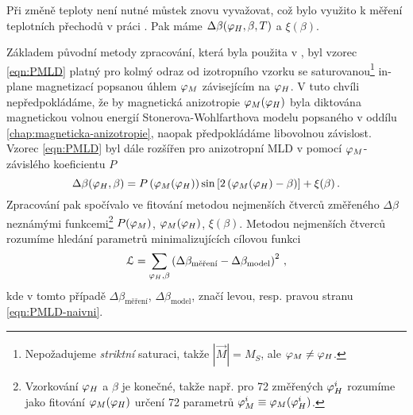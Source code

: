 Při změně teploty není nutné můstek znovu vyvažovat, což bylo využito k měření teplotních přechodů v práci \cite{kubascikMagnetooptickeStudiumAntiferomagnetickych2019}.
Pak máme $\Delta\beta(\varphi_H, \beta, T)$ a $\xi(\beta)$.

Základem původní metody zpracování, která byla použita v \cite{wohlrathMagnetooptickaCharakterizaceSpintronickych2018,kubascikMagnetooptickeStudiumAntiferomagnetickych2019,kimakOptickaSpektroskopieAntiferomagnetu2019}, byl vzorec \eqref{eqn:PMLD} platný pro kolmý odraz od izotropního vzorku se saturovanou\footnote{Nepožadujeme \emph{striktní} saturaci, takže $|\vec{M}|=M_S$, ale $\varphi_M\neq\varphi_H$.} in-plane magnetizací popsanou úhlem $\varphi_M$ závisejícím na $\varphi_H$.
V tuto chvíli nepředpokládáme, že by magnetická anizotropie $\varphi_M(\varphi_H)$ byla diktována magnetickou volnou energií Stonerova-Wohlfarthova modelu popsaného v oddílu \ref{chap:magneticka-anizotropie}, naopak předpokládáme libovolnou závislost.
Vzorec \eqref{eqn:PMLD} byl dále rozšířen pro anizotropní MLD v \cite{wohlrathMagnetooptickaCharakterizaceSpintronickych2018} pomocí $\varphi_M$-závislého koeficientu $P$
\begin{equation}
\label{eqn:PMLD-naivni}
\Delta\beta(\varphi_H, \beta)=P\left(\varphi_M(\varphi_H)\right) \sin\left[2\left(\varphi_M(\varphi_H)-\beta\right)\right]+\xi(\beta) \,.
\end{equation}
Zpracování pak spočívalo ve fitování metodou nejmenších čtverců změřeného $\Delta\beta$ neznámými funkcemi\footnote{Vzorkování $\varphi_H$ a $\beta$ je konečné, takže např. pro 72 změřených $\varphi_H^i$ rozumíme jako fitování $\varphi_M(\varphi_H)$ určení 72 parametrů $\varphi_M^i\equiv\varphi_M(\varphi_H^i)$.} $P(\varphi_M)$, $\varphi_M(\varphi_H)$, $\xi(\beta)$.
Metodou nejmenších čtverců rozumíme hledání parametrů minimalizujících cílovou funkci
\begin{equation}
\label{eqn:L}
    \mathcal{L} = \sum_{\varphi_H, \beta} \left( \Delta\beta_\textrm{měření} - \Delta\beta_\textrm{model} \right)^2\,,
\end{equation}
kde v tomto případě $\Delta\beta_\textrm{měření}$, $\Delta\beta_\textrm{model}$, značí levou, resp. pravou stranu \eqref{eqn:PMLD-naivni}.

